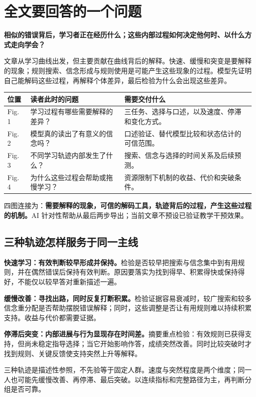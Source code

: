 \documentclass[12pt]{article}
\newcommand{\idea}[2]{\par\Needspace{3\baselineskip}\noindent\textbf{#1。}#2\par}
\begin{document}
\section{全文要回答的一个问题}
\textbf{相似的错误背后，学习者正在经历什么；这些内部过程如何决定他何时、以什么方式走向学会？}

文章从学习曲线出发，但主要贡献在曲线背后的解释。快速、缓慢和突变是要解释的现象；规则搜索、信念形成与规则使用是可能产生这些现象的过程。模型先证明自己能解码这些过程，再解释个体差异，最后检验为什么会出现这些差异。

\begin{center}\small
\begin{tabularx}{\linewidth}{p{1.4cm}Y Y}
\toprule
位置 & 读者此时的问题 & 需要交付什么\\
\midrule
Fig. 1 & 学习过程有哪些需要解释的差异？ & 三任务、选择与口述，以及速度、停滞和变化方式。\\
Fig. 2 & 模型真的读出了有意义的信念吗？ & 口述验证、替代模型比较和状态估计的可信范围。\\
Fig. 3 & 不同学习轨迹内部发生了什么？ & 搜索、信念与选择的时间关系及后续预测。\\
Fig. 4 & 为什么这些过程会帮助或拖慢学习？ & 资源限制下机制的收益、代价和突破条件。\\
\bottomrule
\end{tabularx}
\end{center}

四图连接为：\textbf{需要解释的现象，可信的解码工具，轨迹背后的过程，产生这些过程的机制。}AI 针对性帮助从最后两步导出；当前文章不预设已验证教学干预效果。

\subsection{三种轨迹怎样服务于同一主线}
\idea{快速学习：有效判断较早形成并保持}{检验是否较早把搜索与信念集中到有用规则，并在偶然错误后保持有效判断。原因要落实为找到得早、积累得快或保持得好，不能仅以较早答对重新描述一遍。}
\idea{缓慢改善：寻找出路，同时反复打断积累}{检验证据容易衰减时，较广搜索和较多信念重分配是否帮助摆脱错误解释；同时，这些调整是否让有用规则难以持续积累支持。收益与代价都需要证据。}
\idea{停滞后突变：内部进展与行为显现存在时间差}{摘要重点检验：有效规则已获得支持，但尚未稳定指导选择；当它开始影响作答，成绩突然改善。同时比较突破时才找到规则、关键反馈使支持突然上升等解释。}

三种轨迹是描述性参照，不先验等于固定人群。速度与突然程度是两个维度；同一人也可能先缓慢改善、再停滞、最后突破。以连续指标和完整路径为主，再判断分组是否可靠。
\end{document}
